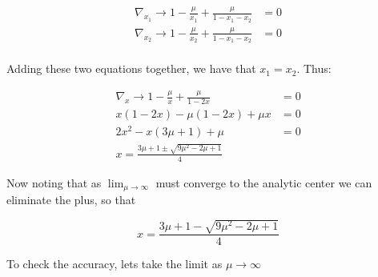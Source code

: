 \documentclass[answers]{exam} %
\begin{document}
\begin{itemize}
\begin{framed}
\begin{equation*}
\begin{aligned}
\nabla_{x_1} \rightarrow 1 - \frac{\mu}{x_1} + \frac{\mu}{1 - x_1 - x_2} &= 0 \\ 
\nabla_{x_2} \rightarrow 1 - \frac{\mu}{x_2} + \frac{\mu}{1 - x_1 - x_2} &= 0 \\
\end{aligned}
\end{equation*}

Adding these two equations together, we have that $x_1 = x_2$. Thus:

\begin{equation*}
\begin{aligned}
\nabla_x \rightarrow 1 - \frac{\mu}{x} + \frac{\mu}{1 - 2x} &= 0 \\ 
x(1 - 2x) - \mu(1 - 2x) + \mu x &= 0 \\ 
2x^2 - x( 3 \mu + 1) + \mu &= 0\\ 
x = \frac{3 \mu + 1 \pm \sqrt{9\mu^2 -2  \mu + 1}} { 4} 
\end{aligned}
\end{equation*}

Now noting that as $\lim_{\mu \to \infty}$ must converge to the analytic center we can eliminate the plus, so that 

\[
x = \frac{3 \mu + 1 -  \sqrt{9\mu^2 -2  \mu + 1}} { 4} 
\]

To check the accuracy, lets take the limit as $\mu \to \infty$


\end{framed}
\end{itemize}
\end{document}
